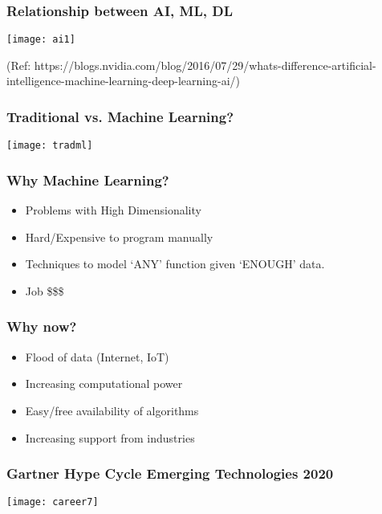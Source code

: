 \begin{frame}[fragile]\frametitle{Relationship between AI, ML, DL}
\begin{center}
\texttt{[image: ai1]}
\end{center}
{\tiny (Ref: https://blogs.nvidia.com/blog/2016/07/29/whats-difference-artificial-intelligence-machine-learning-deep-learning-ai/)}
\end{frame}




\begin{frame}[fragile]\frametitle{Traditional vs. Machine Learning?}
\begin{center}
\texttt{[image: tradml]}
\end{center}
\end{frame}

\begin{frame}[fragile]\frametitle{Why Machine Learning?}
\begin{itemize}
\item Problems with High Dimensionality
\item Hard/Expensive to program manually
\item Techniques to model `ANY' function given `ENOUGH' data.
\item Job \$\$\$
\end{itemize}
\end{frame}



\begin{frame}[fragile]\frametitle{Why now?}
\begin{itemize}
\item Flood of data (Internet, IoT)
\item Increasing computational power
\item Easy/free availability of algorithms 
\item Increasing support from industries
\end{itemize}
\end{frame}


\begin{frame}[fragile]\frametitle{Gartner Hype Cycle Emerging Technologies 2020}
	
	\begin{center}
	\texttt{[image: career7]}
	\end{center}

\end{frame}

